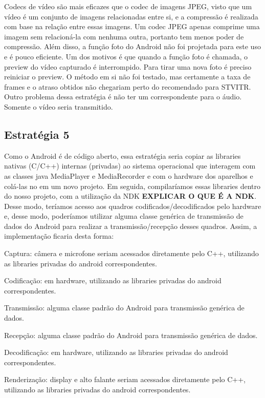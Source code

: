 \documentclass{acm_proc_article-sp}
\newcommand{\todo}[1]{\textcolor[rgb]{1.00,0.00,0.00}{\bf \uppercase{#1}}}
\begin{document}
Codecs de vídeo são mais eficazes que o codec de imagens JPEG, visto que um vídeo é um conjunto de imagens relacionadas entre si, e a compressão é realizada com base na relação entre essas imagens. Um codec JPEG apenas comprime uma imagem sem relacioná-la com nenhuma outra, portanto tem menos poder de compressão. Além disso, a função foto do Android não foi projetada para este uso e é pouco eficiente. Um dos motivos é que quando a função foto é chamada, o preview do vídeo capturado é interrompido. Para tirar uma nova foto é preciso reiniciar o preview. O método em si não foi testado, mas certamente a taxa de frames e o atraso obtidos não chegariam perto do recomendado para STVITR. Outro problema dessa estratégia é não ter um correspondente para o áudio. Somente o vídeo seria transmitido.

\subsection{Estratégia 5}
Como o Android é de código aberto, essa estratégia seria copiar as libraries nativas (C/C++) internas (privadas) ao sistema operacional que interagem com as classes java MediaPlayer e MediaRecorder e com o hardware dos aparelhos e colá-las no em um novo projeto. Em seguida, compilaríamos essas libraries dentro do nosso projeto, com a utilização da NDK \todo{explicar o que é a ndk}. Desse modo, teríamos acesso aos quadros codificados/decodificados pelo hardware e, desse modo, poderíamos utilizar alguma classe genérica de transmissão de dados do Android para realizar a transmissão/recepção desses quadros. Assim, a implementação ficaria desta forma:

Captura: câmera e microfone seriam acessados diretamente pelo C++, utilizando as libraries privadas do android correspondentes.

Codificação: em hardware, utilizando as libraries privadas do android correspondentes.

Transmissão: alguma classe padrão do Android para transmissão genérica de dados.

Recepção: alguma classe padrão do Android para transmissão genérica de dados.

Decodificação: em hardware, utilizando as libraries privadas do android correspondentes.

Renderização: display e alto falante seriam acessados diretamente pelo C++, utilizando as libraries privadas do android correspondentes.
\end{document}
